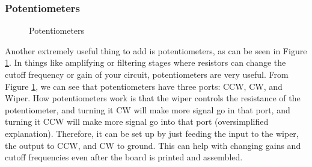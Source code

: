 \subsubsection{Potentiometers}
\begin{figure}[H]
  \centering
\caption{Potentiometers}
\label{img:pot}
\end{figure}

Another extremely useful thing to add is potentiometers, as can be seen in Figure \ref{img:pot}. In things like amplifying or
filtering stages where resistors can change the cutoff frequency or gain of your circuit, potentiometers are very useful. From
Figure \ref{img:pot}, we can see that potentiometers have three ports: CCW, CW, and Wiper. How potentiometers work is that the
wiper controls the resistance of the potentiometer, and turning it CW will make more signal go in that port, and turning it CCW will
make more signal go into that port (oversimplified explanation). Therefore, it can be set up by just feeding the input to the wiper,
the output to CCW, and CW to ground. This can help with changing gains and cutoff frequencies even after the board is printed and
assembled.


